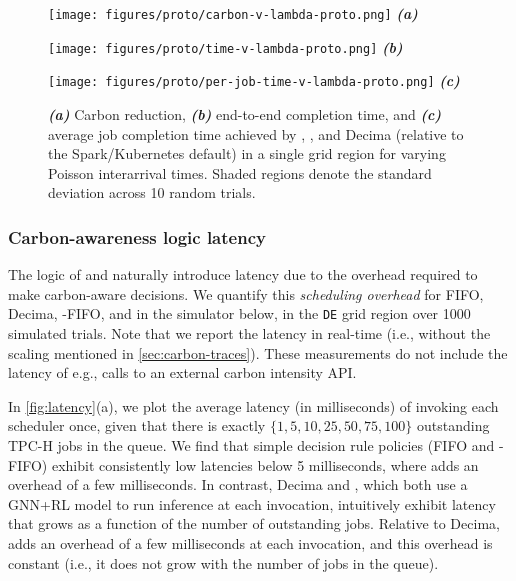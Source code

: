 \begin{figure*}[h]
\begin{minipage}{0.32\linewidth}
        \centering
    \texttt{[image: figures/proto/carbon-v-lambda-proto.png]} \vspace{-1em}
    {\centering \textbf{\textit{(a)}}}
\end{minipage} \hfill
\begin{minipage}{0.32\linewidth}
        \centering
    \texttt{[image: figures/proto/time-v-lambda-proto.png]} \vspace{-1em}
    {\centering \textbf{\textit{(b)}}}
\end{minipage}\hfill
\begin{minipage}{0.32\linewidth}
        \centering
    \texttt{[image: figures/proto/per-job-time-v-lambda-proto.png]} \vspace{-1em}
    {\centering \textbf{\textit{(c)}}}
\end{minipage}
\caption{ \textbf{\textit{(a)}} Carbon reduction, \textbf{\textit{(b)}} end-to-end completion time, and \textbf{\textit{(c)}} average job completion time achieved by \DANISH, \CAP, and Decima (relative to the Spark/Kubernetes default) in a single grid region for varying Poisson interarrival times.  Shaded regions denote the standard deviation across 10 random trials. } \label{fig:lambda-proto}
\end{figure*}


\subsubsection{\textbf{Carbon-awareness logic latency}}
The logic of \DANISH and \CAP naturally introduce latency due to the overhead required to make carbon-aware decisions.  We quantify this \textit{scheduling overhead} for FIFO, Decima, \CAP-FIFO, and \DANISH in the simulator below, in  the \verb|DE| grid region over 1000 simulated trials.  Note that we  report the latency in real-time (i.e.,  without the scaling mentioned  in \autoref{sec:carbon-traces}).  These measurements do not include the latency of e.g., calls to an external carbon intensity API.

In \autoref{fig:latency}(a), we plot the average latency (in milliseconds) of invoking each scheduler once, given that there is exactly $\{1, 5, 10, 25, 50, 75, 100\}$ outstanding TPC-H jobs in the queue.  We find that simple decision rule policies (FIFO and \CAP-FIFO) exhibit consistently low latencies below 5 milliseconds, where \CAP adds an overhead of a few milliseconds.  In contrast, Decima and \PCAPS, which both use a GNN+RL model to run inference at each invocation, intuitively exhibit latency that grows as a function of the number of outstanding jobs.  Relative to Decima, \PCAPS adds an overhead of a few milliseconds at each invocation, and this overhead is constant (i.e., it does not grow with the number of jobs in the queue).

